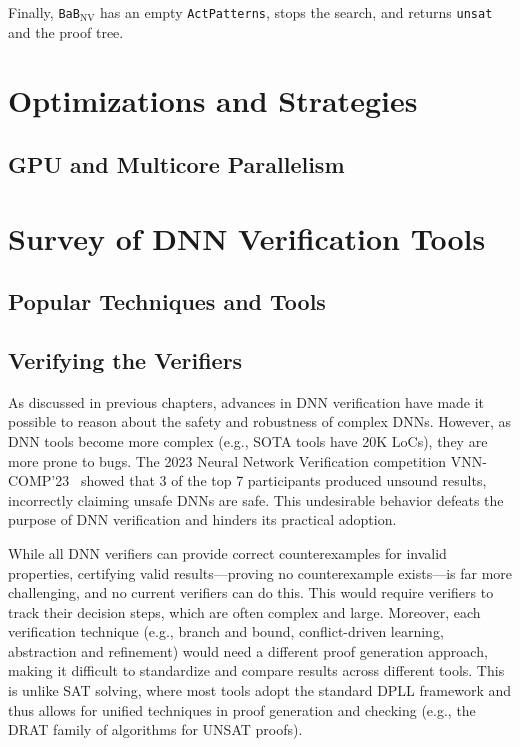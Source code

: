 \documentclass[oneside,11pt,dvipsnames]{book}
\newcommand{\dd}{\texttt{BaB$_{\text{NV}}$}}
\begin{document}
Finally, \dd{} has an empty \texttt{ActPatterns}, stops the search, and returns \texttt{unsat} and the proof tree. 




\part{Optimizations and Strategies}


\chapter{GPU and Multicore Parallelism}


\part{Survey of DNN Verification Tools}

\chapter{Popular Techniques and Tools}
\chapter{Verifying the Verifiers}\label{sec:verifying-verifiers}





As discussed in previous chapters, advances in DNN verification have made it possible to reason about the safety and robustness of complex 
DNNs. However, as DNN tools become more complex (e.g., SOTA tools have 20K LoCs), they are more prone to bugs. The 2023 Neural Network Verification competition VNN-COMP'23~\cite{brix2023fourth} showed that 3 of the top 7 participants produced unsound results, incorrectly claiming unsafe DNNs are safe. This undesirable behavior defeats the purpose of DNN verification and hinders its practical adoption.

While all DNN verifiers can provide correct counterexamples for invalid properties, certifying valid results---proving no counterexample exists---is far more challenging, and no current verifiers can do this. This would require verifiers to track their decision steps, which are often complex and large. Moreover, each verification technique (e.g., branch and bound, conflict-driven learning, abstraction and refinement) would need a different proof generation approach, making it difficult to standardize and compare results across different tools.
This is unlike SAT solving, where most tools adopt the standard DPLL framework and thus allows for unified techniques in proof generation and checking (e.g., the DRAT family of algorithms for UNSAT proofs).
\end{document}
